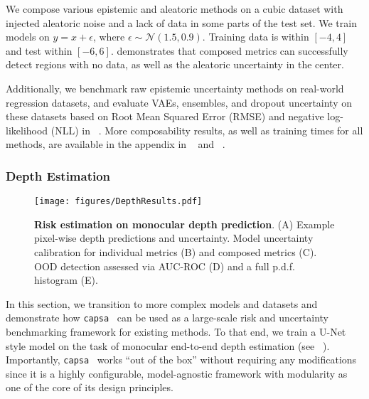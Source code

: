 \documentclass{article} %
\def\capsa{\texttt{{capsa}}}
\begin{document}
We compose various epistemic and aleatoric methods on a cubic dataset with injected aleatoric noise and a lack of data in some parts of the test set. We train models on $y = x + \epsilon$, where $\epsilon \sim \mathcal{N}(1.5, 0.9)$. Training data is within $[-4,4]$ and test within $[-6,6]$.  demonstrates that composed metrics can successfully detect regions with no data, as well as the aleatoric uncertainty in the center.

Additionally, we benchmark raw epistemic uncertainty methods on real-world regression datasets, and evaluate VAEs, ensembles, and dropout uncertainty on these datasets based on Root Mean Squared Error (RMSE) and negative log-likelihood (NLL) in ~. More composability results, as well as training times for all methods, are available in the appendix in ~ and ~. 



\subsubsection{Depth Estimation}

\begin{figure}[t!]
\centering
\texttt{[image: figures/DepthResults.pdf]}
\caption{\textbf{Risk estimation on monocular depth prediction}. (A) Example pixel-wise depth predictions and uncertainty. Model uncertainty calibration for individual metrics (B) and composed metrics (C). OOD detection assessed via AUC-ROC (D) and a full p.d.f. histogram (E).}
\label{fig:depth}
\end{figure}

In this section, we transition to more complex models and datasets and demonstrate how \capsa~ can be used as a large-scale risk and uncertainty benchmarking framework for existing methods. To that end, we train a U-Net style model on the task of monocular end-to-end depth estimation (see ~). Importantly, \capsa~ works ``out of the box'' without requiring any modifications since it is a highly configurable, model-agnostic framework with modularity as one of the core of its design principles.
\end{document}
